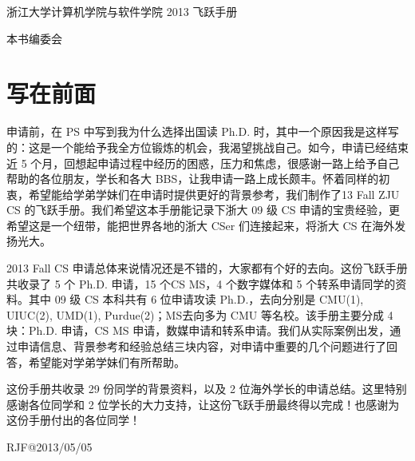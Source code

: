 \documentclass[11pt,fleqn,openany]{book} %
\begin{document}

\begingroup
\thispagestyle{empty}
\centering
\vspace*{9cm}
\par\normalfont\fontsize{35}{35}\sffamily\selectfont
浙江大学计算机学院与软件学院 2013 飞跃手册\par %
\vspace*{1cm}
{\Huge 本书编委会}\par %
\endgroup


\newpage
{}
\chapter*{写在前面}
申请前，在 PS 中写到我为什么选择出国读 Ph.D. 时，其中一个原因我是这样写的：这是一个能给予我全方位锻炼的机会，我渴望挑战自己。如今，申请已经结束近 5 个月，回想起申请过程中经历的困惑，压力和焦虑，很感谢一路上给予自己帮助的各位朋友，学长和各大 BBS，让我申请一路上成长颇丰。怀着同样的初衷，希望能给学弟学妹们在申请时提供更好的背景参考，我们制作了13 Fall ZJU CS 的飞跃手册。我们希望这本手册能记录下浙大 09 级 CS 申请的宝贵经验，更希望这是一个纽带，能把世界各地的浙大 CSer 们连接起来，将浙大 CS 在海外发扬光大。

2013 Fall CS 申请总体来说情况还是不错的，大家都有个好的去向。这份飞跃手册共收录了 5 个 Ph.D. 申请，15 个CS MS，4 个数字媒体和 5 个转系申请同学的资料。其中 09 级 CS 本科共有 6 位申请攻读 Ph.D.，去向分别是 CMU(1), UIUC(2), UMD(1), Purdue(2)；MS去向多为 CMU 等名校。该手册主要分成 4 块：Ph.D. 申请，CS MS 申请，数媒申请和转系申请。我们从实际案例出发，通过申请信息、背景参考和经验总结三块内容，对申请中重要的几个问题进行了回答，希望能对学弟学妹们有所帮助。

这份手册共收录 29 份同学的背景资料，以及 2 位海外学长的申请总结。这里特别感谢各位同学和 2 位学长的大力支持，让这份飞跃手册最终得以完成！也感谢为这份手册付出的各位同学！

\hfill RJF@2013/05/05

~\vfill
\thispagestyle{empty}
\end{document}
